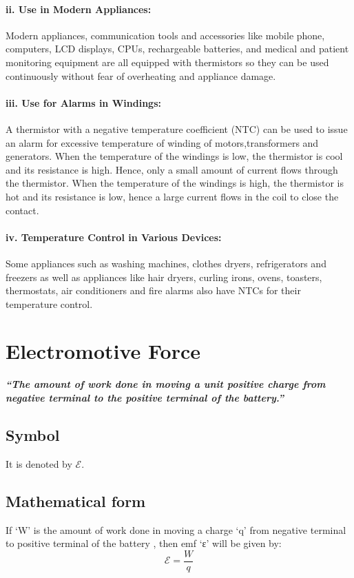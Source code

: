 \paragraph{ii. Use in Modern Appliances:}
Modern appliances, communication tools and accessories like mobile phone, computers, LCD displays, CPUs, rechargeable batteries, and medical and patient monitoring equipment are all equipped with thermistors so they can be used continuously without fear of overheating and appliance damage.
\paragraph{iii. Use for Alarms in Windings:}
A thermistor with a negative temperature coefficient (NTC) can be used to issue an alarm for excessive temperature of winding of motors,transformers and generators. When the temperature of the windings is low, the thermistor is cool and its resistance is high. Hence, only a small amount of current flows through the thermistor. When the temperature of the windings is high, the thermistor is hot and its resistance is low, hence a large current flows in the coil to close the contact.
\paragraph{iv. Temperature Control in Various Devices:}
Some appliances such as washing machines, clothes dryers, refrigerators and freezers as well as appliances like hair dryers, curling irons, ovens, toasters, thermostats, air conditioners and fire alarms also have NTCs for their temperature control. 
\section{Electromotive Force}
\textit{\textbf{``The amount of work done in moving a unit positive charge from negative terminal to the positive terminal of the battery.”}}
\subsection*{Symbol}
It is denoted by $\mathcal{E}$.
\subsection*{Mathematical form}
If ‘W’ is the amount of work done in moving a charge ‘q’ from negative terminal to positive terminal of the battery , then emf ‘ε’ will be
 given by:
\begin{equation}\nonumber
    \mathcal{E} = \frac{W}{q}
\end{equation}
